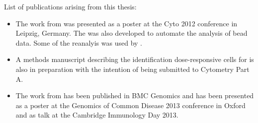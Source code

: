 \begin{publications}

List of publications arising from this thesis:

\begin{itemize}
 \item
   The work from  was presented as a poster at the Cyto 2012 conference in Leipzig, Germany.
   The  was also developed to automate the analysis of bead data.
   Some of the reanalyis was used by .
 \item
   A methods manuscript describing the identification dose-responsive cells for  is also in preparation with the intention of being submitted to Cytometry Part A.
 \item
   The work from  has been published in BMC Genomics  and has been presented as a poster
   at the Genomics of Common Disease 2013 conference in Oxford and as talk at the Cambridge Immunology Day 2013.
\end{itemize}

\end{publications}

